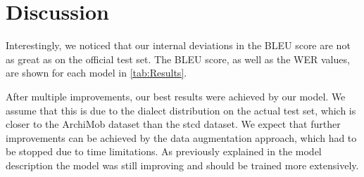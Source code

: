 \section{Discussion}
Interestingly, we noticed that our internal deviations in the BLEU score are not as great as on the official test set. The BLEU score, as well as the WER values, are shown for each model in
\cref{tab:Results}.

After multiple improvements, our best results were achieved by our  model. We assume that this is due to the dialect distribution on the actual test set, which is closer to the ArchiMob dataset
than the \gls{stcd} dataset. We expect that further improvements can be achieved by the data augmentation approach, which had to be stopped due to time limitations. As previously explained in the
model description the  model was still improving and should be trained more extensively.
